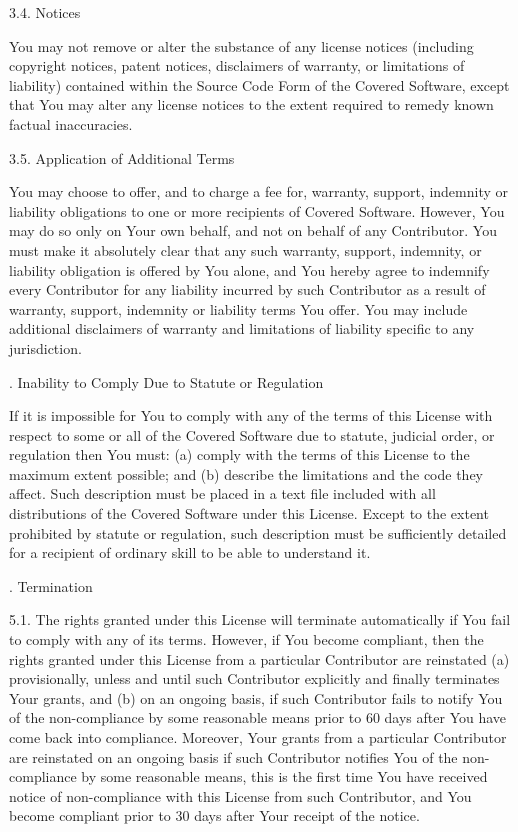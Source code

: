 3.4. Notices

You may not remove or alter the substance of any license notices (including copyright notices, patent notices, disclaimers of warranty, or limitations of liability) contained within the Source Code Form of the Covered Software, except that You may alter any license notices to the extent required to remedy known factual inaccuracies.

3.5. Application of Additional Terms

You may choose to offer, and to charge a fee for, warranty, support, indemnity or liability obligations to one or more recipients of Covered Software. However, You may do so only on Your own behalf, and not on behalf of any Contributor. You must make it absolutely clear that any such warranty, support, indemnity, or liability obligation is offered by You alone, and You hereby agree to indemnify every Contributor for any liability incurred by such Contributor as a result of warranty, support, indemnity or liability terms You offer. You may include additional disclaimers of warranty and limitations of liability specific to any jurisdiction.

. Inability to Comply Due to Statute or Regulation

If it is impossible for You to comply with any of the terms of this License with respect to some or all of the Covered Software due to statute, judicial order, or regulation then You must: (a) comply with the terms of this License to the maximum extent possible; and (b) describe the limitations and the code they affect. Such description must be placed in a text file included with all distributions of the Covered Software under this License. Except to the extent prohibited by statute or regulation, such description must be sufficiently detailed for a recipient of ordinary skill to be able to understand it.

. Termination

5.1. The rights granted under this License will terminate automatically if You fail to comply with any of its terms. However, if You become compliant, then the rights granted under this License from a particular Contributor are reinstated (a) provisionally, unless and until such Contributor explicitly and finally terminates Your grants, and (b) on an ongoing basis, if such Contributor fails to notify You of the non-compliance by some reasonable means prior to 60 days after You have come back into compliance. Moreover, Your grants from a particular Contributor are reinstated on an ongoing basis if such Contributor notifies You of the non-compliance by some reasonable means, this is the first time You have received notice of non-compliance with this License from such Contributor, and You become compliant prior to 30 days after Your receipt of the notice.

